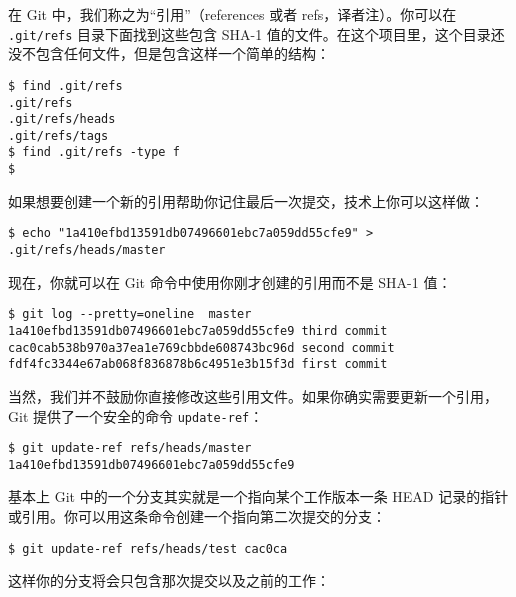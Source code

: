 \documentclass[a4paper]{book}
\begin{document}
在 Git 中，我们称之为“引用”（references 或者 refs，译者注）。你可以在 \texttt{.git/refs} 目录下面找到这些包含 SHA-1 值的文件。在这个项目里，这个目录还没不包含任何文件，但是包含这样一个简单的结构：

\begin{shaded}\begin{verbatim}
$ find .git/refs
.git/refs
.git/refs/heads
.git/refs/tags
$ find .git/refs -type f
$
\end{verbatim}\end{shaded}

如果想要创建一个新的引用帮助你记住最后一次提交，技术上你可以这样做：

\begin{shaded}\begin{verbatim}
$ echo "1a410efbd13591db07496601ebc7a059dd55cfe9" > .git/refs/heads/master
\end{verbatim}\end{shaded}

现在，你就可以在 Git 命令中使用你刚才创建的引用而不是 SHA-1 值：

\begin{shaded}\begin{verbatim}
$ git log --pretty=oneline  master
1a410efbd13591db07496601ebc7a059dd55cfe9 third commit
cac0cab538b970a37ea1e769cbbde608743bc96d second commit
fdf4fc3344e67ab068f836878b6c4951e3b15f3d first commit
\end{verbatim}\end{shaded}

当然，我们并不鼓励你直接修改这些引用文件。如果你确实需要更新一个引用，Git 提供了一个安全的命令 \texttt{update-ref}：

\begin{shaded}\begin{verbatim}
$ git update-ref refs/heads/master 1a410efbd13591db07496601ebc7a059dd55cfe9
\end{verbatim}\end{shaded}

基本上 Git 中的一个分支其实就是一个指向某个工作版本一条 HEAD 记录的指针或引用。你可以用这条命令创建一个指向第二次提交的分支：

\begin{shaded}\begin{verbatim}
$ git update-ref refs/heads/test cac0ca
\end{verbatim}\end{shaded}

这样你的分支将会只包含那次提交以及之前的工作：
\end{document}
